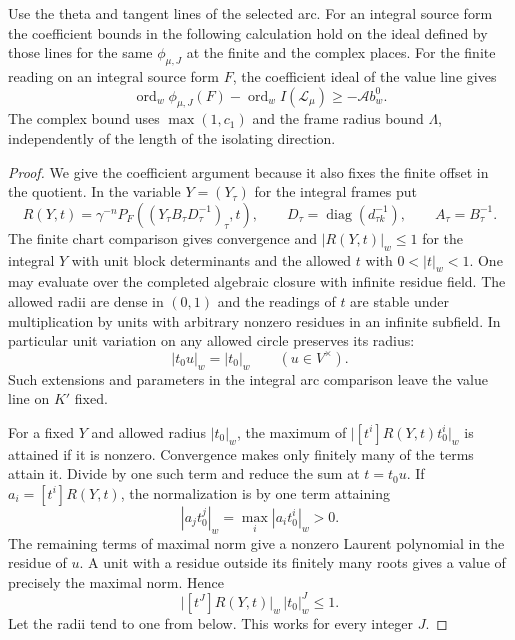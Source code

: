 \begin{lemma}
\label{lem:cm-coefficient-metrics}
Use the theta and tangent lines of the selected arc. For an integral
source form the coefficient bounds in the following calculation hold
on the ideal defined by those lines for the same \(\phi_{\mu,J}\)
at the finite and the complex places. For the finite reading on an integral source form \(F\), the coefficient ideal of the value line gives
\[
 \operatorname{ord}_w\phi_{\mu,J}(F)-\operatorname{ord}_w I(\mathcal L_\mu)\ge-\mathcal A b_w^0.
\]
The complex bound uses \(\max(1,c_1)\) and the frame radius bound \(\Lambda\), independently of the length of the isolating direction.
\end{lemma}

\begin{proof}
We give the coefficient argument because it also fixes the finite
offset in the quotient. In the variable
\(Y=(Y_\tau)\) for the integral frames put
\[
 R(Y,t)=\gamma^{-n}P_F((Y_\tau B_\tau D_\tau^{-1})_\tau,t),
 \qquad D_\tau=\operatorname{diag}(d_{\tau k}^{-1}),
 \qquad A_\tau=B_\tau^{-1}.
\]
The finite chart comparison gives convergence and
\(|R(Y,t)|_w\le1\) for the integral \(Y\) with unit block
determinants and the allowed \(t\) with \(0<|t|_w<1\).
One may evaluate over the completed algebraic closure with
infinite residue field. The allowed radii are dense in
\((0,1)\) and the readings of \(t\) are stable under multiplication
by units with arbitrary nonzero residues in an infinite
subfield.
In particular unit variation on any allowed circle preserves its radius:
\[
  |t_0u|_w=|t_0|_w\qquad(u\in V^\times).
\]
 Such extensions and parameters in the integral arc
comparison leave the value line on \(K'\) fixed.

For a fixed \(Y\) and allowed radius \(|t_0|_w\), the maximum
of \(\big|[t^i]R(Y,t)t_0^i\big|_w\) is attained if it is nonzero.
Convergence makes only finitely many of the terms attain it.
Divide by one such term and reduce the sum at \(t=t_0u\).
If \(a_i=[t^i]R(Y,t)\), the normalization is by one term attaining
\[
  |a_jt_0^j|_w=\max_i |a_it_0^i|_w>0 .
\]
The remaining terms of maximal norm give a nonzero Laurent
polynomial in the residue of \(u\). A unit with a residue
outside its finitely many roots gives a value of precisely
the maximal norm. Hence
\[
 \big|[t^J]R(Y,t)\big|_w\,|t_0|_w^J\le1.
\]
Let the radii tend to one from below. This works for every
integer \(J\).


\end{proof}
